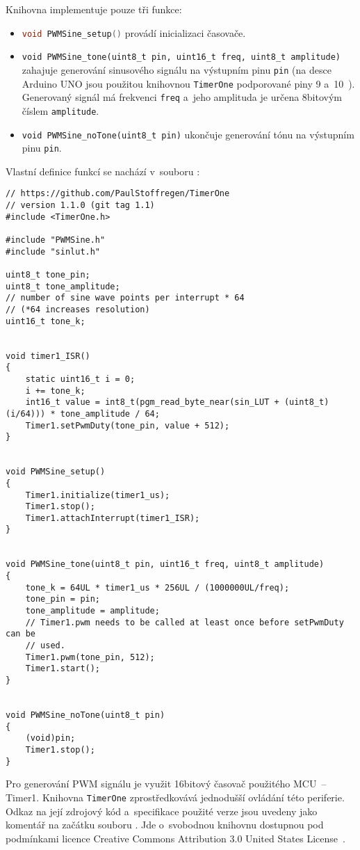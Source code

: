 Knihovna implementuje pouze tři funkce:
\begin{itemize}[nosep]
    \item \lstinline[language=C]!void PWMSine_setup()! provádí inicializaci časovače.

    \item \lstinline[language=myC++]!void PWMSine_tone(uint8_t pin, uint16_t freq, uint8_t amplitude)!
        zahajuje generování sinusového signálu na výstupním pinu \texttt{pin}
        (na desce Arduino UNO jsou použitou knihovnou \texttt{TimerOne}
        podporované piny 9 a~10~\cite{TimerOnedocs}). Generovaný signál má
        frekvenci \texttt{freq} a~jeho amplituda je určena 8bitovým číslem
        \texttt{amplitude}.

    \item \lstinline[language=myC++]!void PWMSine_noTone(uint8_t pin)!
        ukončuje generování tónu na výstupním pinu \texttt{pin}.
\end{itemize}

Vlastní definice funkcí se nachází v~souboru :
\begin{lstlisting}[language=myC++,style=numbers]
// https://github.com/PaulStoffregen/TimerOne
// version 1.1.0 (git tag 1.1)
#include <TimerOne.h>

#include "PWMSine.h"
#include "sinlut.h"

uint8_t tone_pin;
uint8_t tone_amplitude;
// number of sine wave points per interrupt * 64
// (*64 increases resolution)
uint16_t tone_k;


void timer1_ISR()
{
    static uint16_t i = 0;
    i += tone_k;
    int16_t value = int8_t(pgm_read_byte_near(sin_LUT + (uint8_t)(i/64))) * tone_amplitude / 64;
    Timer1.setPwmDuty(tone_pin, value + 512);
}


void PWMSine_setup()
{
    Timer1.initialize(timer1_us);
    Timer1.stop();
    Timer1.attachInterrupt(timer1_ISR);
}


void PWMSine_tone(uint8_t pin, uint16_t freq, uint8_t amplitude)
{
    tone_k = 64UL * timer1_us * 256UL / (1000000UL/freq);
    tone_pin = pin;
    tone_amplitude = amplitude;
    // Timer1.pwm needs to be called at least once before setPwmDuty can be
    // used.
    Timer1.pwm(tone_pin, 512);
    Timer1.start();
}


void PWMSine_noTone(uint8_t pin)
{
    (void)pin;
    Timer1.stop();
}
\end{lstlisting}

Pro generování PWM signálu je využit 16bitový časovač použitého MCU~-- Timer1.
Knihovna \texttt{TimerOne} zprostředkovává jednodušší ovládání této periferie.
Odkaz na její zdrojový kód a~specifikace použité verze jsou uvedeny jako
komentář na začátku souboru . Jde o~svobodnou knihovnu
dostupnou pod podmínkami licence
\foreignlanguage{english}{Creative Commons Attribution 3.0 United States
License}~\cite{TimerOnerepo}.

